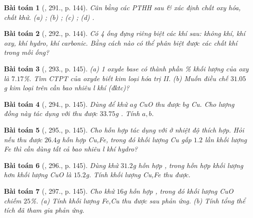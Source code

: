 \documentclass{article}
\newtheorem{baitoan}{Bài toán}
\begin{document}
\begin{baitoan}[\cite{An_400_BT_Hoa_Hoc_8_2020}, 291., p. 144]
	Cân bằng các PTHH sau \& xác định chất oxy hóa, chất khử. (a) \emph{}; (b) \emph{}; (c) \emph{}; (d) \emph{}.
\end{baitoan}

\begin{baitoan}[\cite{An_400_BT_Hoa_Hoc_8_2020}, 292., p. 144]
	Có 4 ống đựng riêng biệt các khí sau: không khí, khí oxy, khí hydro, khí carbonic. Bằng cách nào có thể phân biệt được các chất khí trong mỗi ống?
\end{baitoan}

\begin{baitoan}[\cite{An_400_BT_Hoa_Hoc_8_2020}, 293., p. 145]
	(a) 1 oxyde base có thành phần \% khối lượng của oxy là $7.17$\%. Tìm CTPT của oxyde biết kim loại hóa trị II. (b) Muốn điều chế $31.05$\emph{g} kim loại trên cần bao nhiêu \emph{l} khí \emph{} (đktc)?
\end{baitoan}

\begin{baitoan}[\cite{An_400_BT_Hoa_Hoc_8_2020}, 294., p. 145]
	Dùng \emph{} để khử $a$\emph{g} \emph{CuO} thu được $b$\emph{g} \emph{Cu}. Cho lượng đồng này tác dụng với \emph{} thu được $33.75$\emph{g} \emph{}. Tính $a,b$.
\end{baitoan}

\begin{baitoan}[\cite{An_400_BT_Hoa_Hoc_8_2020}, 295., p. 145]
	Cho hỗn hợp \emph{} tác dụng với \emph{} ở nhiệt độ thích hợp. Hỏi nếu thu được $26.4$\emph{g} hỗn hợp \emph{Cu,Fe}, trong đó khối lượng \emph{Cu} gấp $1.2$ lần khối lượng \emph{Fe} thì cần dùng tất cả bao nhiêu \emph{l} khí hydro?
\end{baitoan}

\begin{baitoan}[\cite{An_400_BT_Hoa_Hoc_8_2020}, 296., p. 145]
	Dùng \emph{} khử $31.2$\emph{g} hỗn hợp \emph{}, trong hỗn hợp khối lượng \emph{} hơn khối lượng \emph{CuO} là $15.2$\emph{g}. Tính khối lượng \emph{Cu,Fe} thu được.
\end{baitoan}

\begin{baitoan}[\cite{An_400_BT_Hoa_Hoc_8_2020}, 297., p. 145]
	Cho \emph{} khử $16$\emph{g} hỗn hợp \emph{}, trong đó khối lượng \emph{CuO} chiếm $25$\%. (a) Tính khối lượng \emph{Fe,Cu} thu được sau phản ứng. (b) Tính tổng thể tích \emph{} đã tham gia phản ứng.
\end{baitoan}
\end{document}
